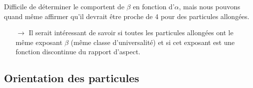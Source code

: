 \documentclass{beamer}
\begin{document}
\begin{frame}
Difficile de déterminer le comportent de $\beta$ en fonction d'$\alpha$, mais nous pouvons quand même affirmer qu’il devrait être proche de 4 pour des particules allongées.
\begin{itemize}
\item[$\rightarrow$] Il serait intéressant de savoir si toutes les particules allongées ont le même exposant $\beta$ (même classe d’universalité) et si cet exposant est une fonction discontinue du rapport d’aspect.
\end{itemize}
\end{frame}

\subsection{Orientation des particules}
\end{document}
